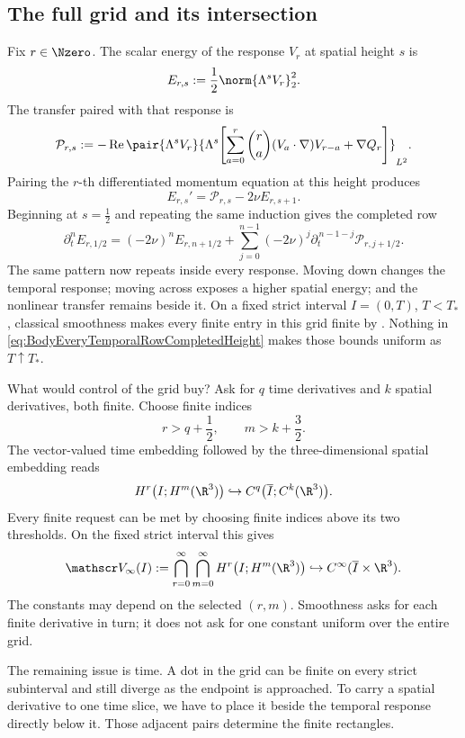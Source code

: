 \subsection{The full grid and its intersection}\label{sub:SobolevRegularityInsideEveryCompletedRow}

Fix \(r\in\Nzero\).  The scalar energy of the response \(V_r\) at spatial
height \(s\) is
\[
  E_{r,s}:=\frac12\norm{\Lambda^sV_r}_2^2.
\]
The transfer paired with that response is
\[
  \mathcal P_{r,s}
  :=-
  \operatorname{Re}
  \pair{\Lambda^sV_r}
  {\Lambda^s\!\left[
    \sum_{a=0}^{r}\binom{r}{a}(V_a\cdot\nabla)V_{r-a}
    +\nabla Q_r
  \right]}_{L^2}.
\]
Pairing the \(r\)-th differentiated momentum equation at this height produces
\begin{equation}\label{eq:BodyEveryTemporalRowSpatialEnergy}
  E_{r,s}'=\mathcal P_{r,s}-2\nu E_{r,s+1}.
\end{equation}
Beginning at \(s=\tfrac12\) and repeating the same induction gives the completed row
\begin{equation}\label{eq:BodyEveryTemporalRowCompletedHeight}
  \partial_t^nE_{r,1/2}
  =(-2\nu)^nE_{r,n+1/2}
  +\sum_{j=0}^{n-1}
  (-2\nu)^j
  \partial_t^{\,n-1-j}\mathcal P_{r,j+1/2}.
\end{equation}
The same pattern now repeats inside every response.  Moving down changes the
temporal response; moving across exposes a higher spatial energy; and the
nonlinear transfer remains beside it.  On a fixed strict interval
\(I=(0,T)\), \(T<T_*\), classical smoothness makes every finite entry in this
grid finite by .  Nothing in
\eqref{eq:BodyEveryTemporalRowCompletedHeight} makes those bounds uniform as
\(T\uparrow T_*\).

What would control of the grid buy?  Ask for \(q\) time derivatives and \(k\)
spatial derivatives, both finite.  Choose
finite indices
\[
  r>q+\frac12,
  \qquad
  m>k+\frac32.
\]
The vector-valued time embedding followed by the three-dimensional spatial
embedding \parencite[Theorem~7.28]{Cerda2010} reads
\[
  H^r\bigl(I;H^m(\R^3)\bigr)
  \hookrightarrow
  C^q\bigl(\overline I;C^k(\R^3)\bigr).
\]
Every finite request can be met by choosing finite indices above its two
thresholds.  On the fixed strict interval this gives
\begin{equation}\label{eq:BodyFormalMixedIntersection}
  \mathscr V_\infty(I)
  :=\bigcap_{r=0}^{\infty}\bigcap_{m=0}^{\infty}
  H^r\bigl(I;H^m(\R^3)\bigr)
  \hookrightarrow C^\infty(\overline I\times\R^3).
\end{equation}
The constants may depend on the selected \((r,m)\).  Smoothness asks for each
finite derivative in turn; it does not ask for one constant uniform over the
entire grid.

The remaining issue is time.  A dot in the grid can be finite on every strict
subinterval and still diverge as the endpoint is approached.  To carry a
spatial derivative to one time slice, we have to place it beside the temporal
response directly below it.  Those adjacent pairs determine the finite
rectangles.
